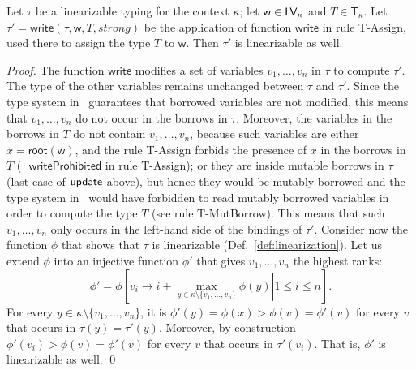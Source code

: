 \begin{lemma}\label{lem:write_invariant}
  Let $\tau$ be a linearizable typing for the context $\kappa$;
  let $\mathsf{w}\in\mathsf{LV}_\kappa$ and $T\in\mathsf{T}_\kappa$.
  Let $\tau'=\mathsf{write}(\tau,\mathsf{w},T,\mathit{strong})$ be
  the application of function $\mathsf{write}$ in rule \textsf{T-Assign},
  used there to assign the type $T$ to $\mathsf{w}$.
  Then $\tau'$ is linearizable as well.
\end{lemma}
\begin{proof}
  The function $\mathsf{write}$ modifies a set of variables $v_1,\ldots,v_n$ in $\tau$ to compute $\tau'$.
  The type of the other variables remains unchanged between $\tau$ and $\tau'$. Since the
  type system in~\cite{Pearce21} guarantees that borrowed variables are not modified,
  this means that $v_1,\ldots,v_n$ do not occur in the borrows in $\tau$. Moreover,
  the variables in the borrows in $T$ do not contain $v_1,\ldots,v_n$, because
  such variables are either $x=\mathsf{root}(\mathsf{w})$, and the rule \textsf{T-Assign}
  forbids the presence of $x$ in the borrows in $T$ ($\neg\mathsf{writeProhibited}$ in rule
  \textsf{T-Assign}); or they are inside mutable borrows in $\tau$ (last case of
  $\mathsf{update}$ above), but hence they would be mutably borrowed and the type system
  in~\cite{Pearce21} would have forbidden to read mutably borrowed variables in order to compute
  the type $T$ (see rule \textsf{T-MutBorrow}).
  This means that such $v_1,\ldots,v_n$ only occurs in the left-hand side of the bindings of $\tau'$.
  Consider now the function $\phi$ that shows that $\tau$ is linearizable
  (Def.~\ref{def:linearization}).
  Let us extend $\phi$ into an injective function $\phi'$
  that gives $v_1,\ldots,v_n$ the highest ranks:
  \[
  \phi'=\phi\left[\left.v_i\to i+\max\limits_{y\in\kappa\setminus\{v_1,\ldots,v_n\}}\phi(y)\right|1\le i\le n\right].
  \]
  For every $y\in\kappa\setminus\{v_1,\ldots,v_n\}$, it is
  $\phi'(y)=\phi(x)>\phi(v)=\phi'(v)$ for every $v$ that occurs in $\tau(y)=\tau'(y)$.
  Moreover, by construction $\phi'(v_i)>\phi(v)=\phi'(v)$ for every $v$ that occurs in $\tau'(v_i)$.
  That is, $\phi'$ is linearizable as well.
  \qed
\end{proof}
